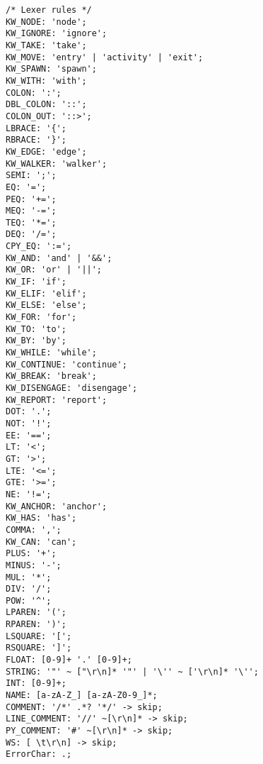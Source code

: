 \begin{lstlisting}[style=gram, numbers=none,
    captionpos=t, caption=Jac Language Lexer Rules]
/* Lexer rules */
KW_NODE: 'node';
KW_IGNORE: 'ignore';
KW_TAKE: 'take';
KW_MOVE: 'entry' | 'activity' | 'exit';
KW_SPAWN: 'spawn';
KW_WITH: 'with';
COLON: ':';
DBL_COLON: '::';
COLON_OUT: '::>';
LBRACE: '{';
RBRACE: '}';
KW_EDGE: 'edge';
KW_WALKER: 'walker';
SEMI: ';';
EQ: '=';
PEQ: '+=';
MEQ: '-=';
TEQ: '*=';
DEQ: '/=';
CPY_EQ: ':=';
KW_AND: 'and' | '&&';
KW_OR: 'or' | '||';
KW_IF: 'if';
KW_ELIF: 'elif';
KW_ELSE: 'else';
KW_FOR: 'for';
KW_TO: 'to';
KW_BY: 'by';
KW_WHILE: 'while';
KW_CONTINUE: 'continue';
KW_BREAK: 'break';
KW_DISENGAGE: 'disengage';
KW_REPORT: 'report';
DOT: '.';
NOT: '!';
EE: '==';
LT: '<';
GT: '>';
LTE: '<=';
GTE: '>=';
NE: '!=';
KW_ANCHOR: 'anchor';
KW_HAS: 'has';
COMMA: ',';
KW_CAN: 'can';
PLUS: '+';
MINUS: '-';
MUL: '*';
DIV: '/';
POW: '^';
LPAREN: '(';
RPAREN: ')';
LSQUARE: '[';
RSQUARE: ']';
FLOAT: [0-9]+ '.' [0-9]+;
STRING: '"' ~ ["\r\n]* '"' | '\'' ~ ['\r\n]* '\'';
INT: [0-9]+;
NAME: [a-zA-Z_] [a-zA-Z0-9_]*;
COMMENT: '/*' .*? '*/' -> skip;
LINE_COMMENT: '//' ~[\r\n]* -> skip;
PY_COMMENT: '#' ~[\r\n]* -> skip;
WS: [ \t\r\n] -> skip;
ErrorChar: .;
\end{lstlisting}